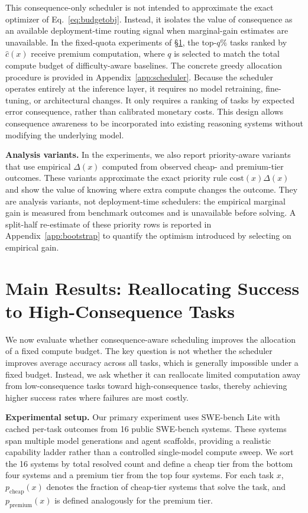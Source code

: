 \documentclass{article}
\begin{document}
This consequence-only scheduler is not intended to approximate the
exact optimizer of Eq.~\ref{eq:budgetobj}. Instead, it isolates the
value of consequence as an available deployment-time routing signal
when marginal-gain estimates are unavailable. In the fixed-quota
experiments of \S\ref{sec:main}, the top-$q\%$ tasks ranked by
$\hat{c}(x)$ receive premium computation, where $q$ is selected to match
the total compute budget of difficulty-aware baselines. The concrete
greedy allocation procedure is provided in
Appendix~\ref{app:scheduler}.
Because the scheduler operates entirely at the inference layer, it
requires no model retraining, fine-tuning, or architectural changes.
It only requires a ranking of tasks by expected error consequence,
rather than calibrated monetary costs. This design allows consequence
awareness to be incorporated into existing reasoning systems without
modifying the underlying model.

\textbf{Analysis variants.}
In the experiments, we also report priority-aware variants that use
empirical $\Delta(x)$ computed from observed cheap- and premium-tier
outcomes. These variants approximate the exact priority rule
$\mathrm{cost}(x)\Delta(x)$ and show the value of knowing where extra
compute changes the outcome. They are analysis variants, not
deployment-time schedulers: the empirical marginal gain is measured
from benchmark outcomes and is unavailable before solving. A split-half
re-estimate of these priority rows is reported in
Appendix~\ref{app:bootstrap} to quantify the optimism introduced by
selecting on empirical gain.

\section{Main Results: Reallocating Success to High-Consequence Tasks}
\label{sec:main}

We now evaluate whether consequence-aware scheduling improves the
allocation of a fixed compute budget. The key question is not whether
the scheduler improves average accuracy across all tasks, which is
generally impossible under a fixed budget. Instead, we ask whether it
can reallocate limited computation away from low-consequence tasks
toward high-consequence tasks, thereby achieving higher success rates
where failures are most costly.

\textbf{Experimental setup.}
Our primary experiment uses SWE-bench Lite with cached per-task
outcomes from 16 public SWE-bench systems. These systems span multiple
model generations and agent scaffolds, providing a realistic capability
ladder rather than a controlled single-model compute sweep. We sort the
16 systems by total resolved count and define a cheap tier from the
bottom four systems and a premium tier from the top four systems. For
each task $x$, $p_{\mathrm{cheap}}(x)$ denotes the fraction of
cheap-tier systems that solve the task, and
$p_{\mathrm{premium}}(x)$ is defined analogously for the premium tier.
\end{document}
